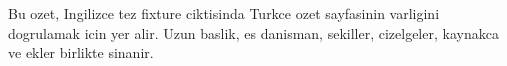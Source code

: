 Bu ozet, Ingilizce tez fixture ciktisinda Turkce ozet sayfasinin varligini
dogrulamak icin yer alir. Uzun baslik, es danisman, sekiller, cizelgeler,
kaynakca ve ekler birlikte sinanir.
